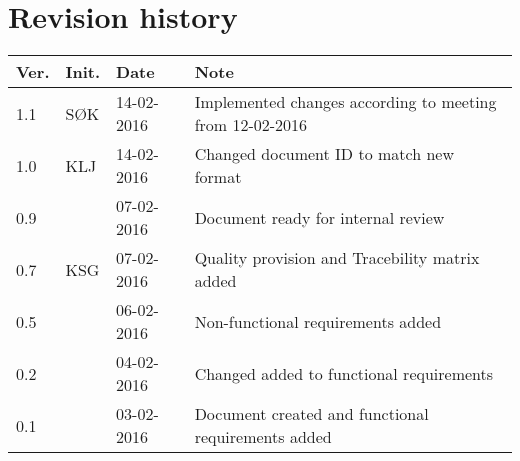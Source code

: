 \label{chp_revisionHistory}
\chapter{Revision history}

\begin{tabular}{b{1cm} b{1cm} b{2cm} b{8cm}}
    \textbf{Ver.} & \textbf{Init.} & \textbf{Date} & \textbf{Note} \\
    \hline
    1.1 & SØK & 14-02-2016 & Implemented changes according to meeting from 12-02-2016 \\ 
    1.0 & KLJ & 14-02-2016 & Changed document ID to match new format \\
    0.9 & & 07-02-2016 & Document ready for internal review \\
    0.7 & KSG & 07-02-2016 & Quality provision and Tracebility matrix added \\
    0.5 & & 06-02-2016 & Non-functional requirements added \\
    0.2 & & 04-02-2016 & Changed added to functional requirements \\
    0.1 & & 03-02-2016 & Document created and functional requirements added  \\
\end{tabular}
